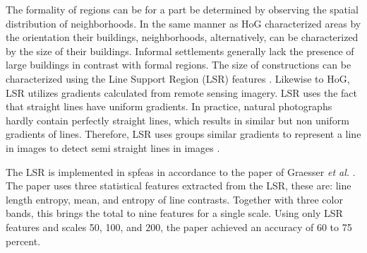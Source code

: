 The formality of regions can be for a part be determined by observing the
spatial distribution of neighborhoods. In the same manner as HoG characterized
areas by the orientation their buildings, neighborhoods, alternatively, can be
characterized by the size of their buildings. Informal settlements generally
lack the presence of large buildings in contrast with formal regions. The size
of constructions can be characterized using the Line Support Region (LSR)
features \cite{unsalan2004classifying}. Likewise to HoG, LSR utilizes gradients
calculated from remote sensing imagery. LSR uses the fact that straight lines
have uniform gradients. In practice, natural photographs hardly contain
perfectly straight lines, which results in similar but non uniform gradients of
lines. Therefore, LSR uses groups similar gradients to represent a line in
images to detect semi straight lines in images \cite{burns1986extracting}.

The LSR is implemented in spfeas in accordance to the paper of Graesser \textit{et al.} \cite{graesser2012image}. The paper uses three statistical features extracted
from the LSR, these are: line length entropy, mean, and entropy of line
contrasts. Together with three color bands, this brings the total to nine
features for a single scale. Using only LSR features and scales 50, 100, and 200, the paper achieved an accuracy of 60 to 75 percent.
